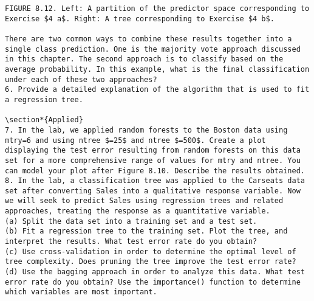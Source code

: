 \documentclass[10pt]{article}
\begin{document}
\begin{verbatim}
FIGURE 8.12. Left: A partition of the predictor space corresponding to Exercise $4 a$. Right: A tree corresponding to Exercise $4 b$.

There are two common ways to combine these results together into a single class prediction. One is the majority vote approach discussed in this chapter. The second approach is to classify based on the average probability. In this example, what is the final classification under each of these two approaches?
6. Provide a detailed explanation of the algorithm that is used to fit a regression tree.

\section*{Applied}
7. In the lab, we applied random forests to the Boston data using mtry=6 and using ntree $=25$ and ntree $=500$. Create a plot displaying the test error resulting from random forests on this data set for a more comprehensive range of values for mtry and ntree. You can model your plot after Figure 8.10. Describe the results obtained.
8. In the lab, a classification tree was applied to the Carseats data set after converting Sales into a qualitative response variable. Now we will seek to predict Sales using regression trees and related approaches, treating the response as a quantitative variable.
(a) Split the data set into a training set and a test set.
(b) Fit a regression tree to the training set. Plot the tree, and interpret the results. What test error rate do you obtain?
(c) Use cross-validation in order to determine the optimal level of tree complexity. Does pruning the tree improve the test error rate?
(d) Use the bagging approach in order to analyze this data. What test error rate do you obtain? Use the importance() function to determine which variables are most important.


\end{verbatim}
\end{document}
